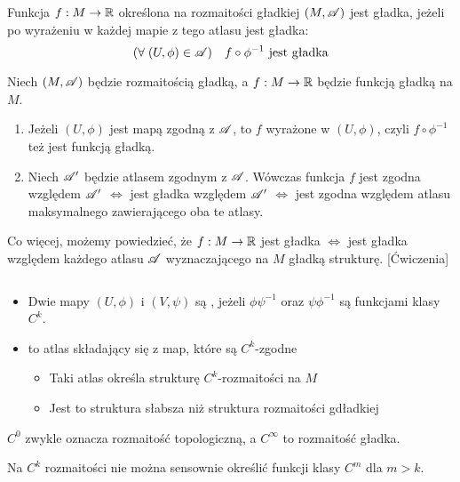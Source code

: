 \begin{definition}
   Funkcja $f:M\to\mathbb{R}$ określona na rozmaitości gładkiej $(M, \mathcal{A})$ jest gładka, jeżeli po wyrażeniu w każdej mapie z tego atlasu jest gładka:
   $$(\forall\;(U,\phi)\in\mathcal{A})\quad f\circ\phi^{-1}\text{ jest gładka}$$
\end{definition}

\begin{fact}
    Niech $(M,\mathcal{A})$ będzie rozmaitością gładką, a $f:M\to\mathbb{R}$ będzie funkcją gładką na $M$.
    \begin{enumerate}
        \item Jeżeli $(U, \phi)$ jest mapą zgodną z $\mathcal{A}$, to $f$ wyrażone w $(U, \phi)$, czyli $f\circ\phi^{-1}$ też jest funkcją gładką.
        \item Niech $\mathcal{A}'$ będzie atlasem zgodnym z $\mathcal{A}$. Wówczas funkcja $f$ jest zgodna względem $\mathcal{A}'$ $\iff$ jest gładka względem $\mathcal{A}'$ $\iff$ jest zgodna względem atlasu maksymalnego zawierającego oba te atlasy. 
    \end{enumerate}
\end{fact}

Co więcej, możemy powiedzieć, że $f:M\to\mathbb{R}$ jest gładka $\iff$ jest gładka względem każdego atlasu $\mathcal{A}$ wyznaczającego na $M$ gładką strukturę. [Ćwiczenia]

\begin{definition}
$ $\newline
\begin{itemize}
    \item Dwie mapy $(U, \phi)$ i $(V,\psi)$ są , jeżeli $\phi\psi^{-1}$ oraz $\psi\phi^{-1}$ są funkcjami klasy $C^k$.
    \item {} to atlas składający się z map, które są $C^k$-zgodne
    \begin{itemize}
        \item Taki atlas określa strukturę $C^k$-rozmaitości na $M$
        \item Jest to struktura słabsza niż struktura rozmaitości gdładkiej
    \end{itemize}
\end{itemize}
\end{definition}

$C^0$ zwykle oznacza rozmaitość topologiczną, a $C^\infty$ to rozmaitość gładka.

\begin{fact}
Na $C^k$ rozmaitości nie można sensownie określić funkcji klasy $C^m$ dla $m>k$.
\end{fact}

